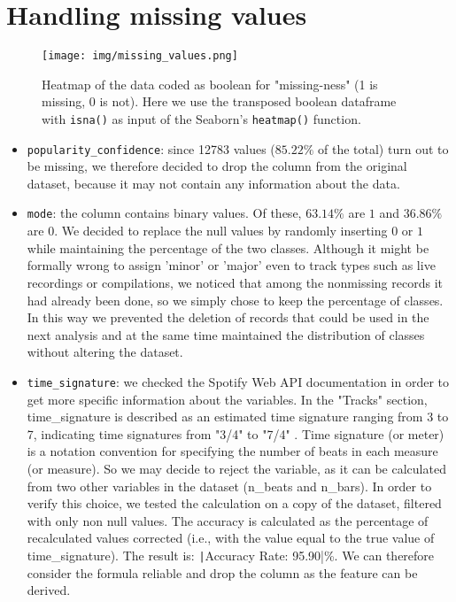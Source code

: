 \section{Handling missing values}
\begin{figure}[H]
    \centering
    \texttt{[image: img/missing\_values.png]}
    \caption{Heatmap of the data coded as boolean for "missing-ness" (1 is missing, 0 is not). Here we use the transposed boolean dataframe with \texttt{isna()} as input of the Seaborn’s \texttt{heatmap()} function.}
    \label{fig:missing-values}
\end{figure}
\begin{itemize}
\item \texttt{popularity\_confidence}: since 12783 values ($85.22\%$ of the total) turn out to be missing, we therefore decided to drop the column from the original dataset, because it may not contain any information about the data.
\item \texttt{mode}: the column contains binary values. Of these, $63.14\%$ are $1$ and $36.86\%$ are $0$. We decided to replace the null values by randomly inserting $0$ or $1$ while maintaining the percentage of the two classes. Although it might be formally wrong to assign 'minor' or 'major' even to track types such as live recordings or compilations, we noticed that among the nonmissing records it had already been done, so we simply chose to keep the percentage of classes. In this way we prevented the deletion of records that could be used in the next analysis and at the same time maintained the distribution of classes without altering the dataset.
\item \texttt{time\_signature}: we checked the Spotify Web API documentation in order to get more specific information about the variables. In the "Tracks" section, time\_signature is described as an estimated time signature ranging from 3 to 7, indicating time signatures from "3/4" to "7/4" . Time signature (or meter) is a notation convention for specifying the number of beats in each measure (or measure). So we may decide to reject the variable, as it can be calculated from two other variables in the dataset (n\_beats and n\_bars). In order to verify this choice, we tested the calculation on a copy of the dataset, filtered with only non null values. The accuracy is calculated as the percentage of recalculated values corrected (i.e., with the value equal to the true value of time\_signature). The result is: \texttt|Accuracy Rate: 95.90|\%. We can therefore consider the formula reliable and drop the column as the feature can be derived.
\end{itemize}

